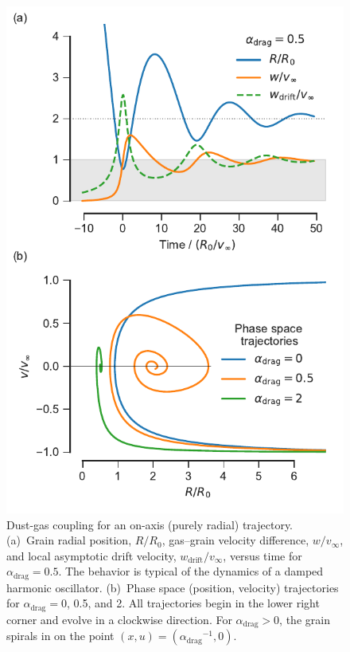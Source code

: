 \newcommand\drag{\ensuremath{_{\text{drag}}}}
\newcommand{\gas}{\ensuremath{_{\text{gas}}}}
\newcommand{\drift}{\ensuremath{_{\text{drift}}}}
\newcommand\soundspeed{\ensuremath{c_{\text{s,gas}}}}


\begin{figure}
  \centering
  \includegraphics[width=\linewidth]{figs/dust-coupling-1d}
  \caption{Dust-gas coupling for an on-axis (purely radial)
    trajectory.  (a)~Grain radial position, \(R/R_0\), gas--grain
    velocity difference, \(w/v_\infty\), and local asymptotic drift
    velocity, \(w\drift/v_\infty\), versus time for
    \(\alpha\drag = 0.5\).  The behavior is typical of the dynamics of a
    damped harmonic oscillator. (b)~Phase space (position, velocity)
    trajectories for \(\alpha\drag = 0\), 0.5, and 2. All trajectories
    begin in the lower right corner and evolve in a clockwise
    direction. For \(\alpha\drag > 0\), the grain spirals in on the point
    \((x, u) = (\alpha\drag^{-1}, 0)\).}
  \label{fig:dust-coupling-1d}
\end{figure}

